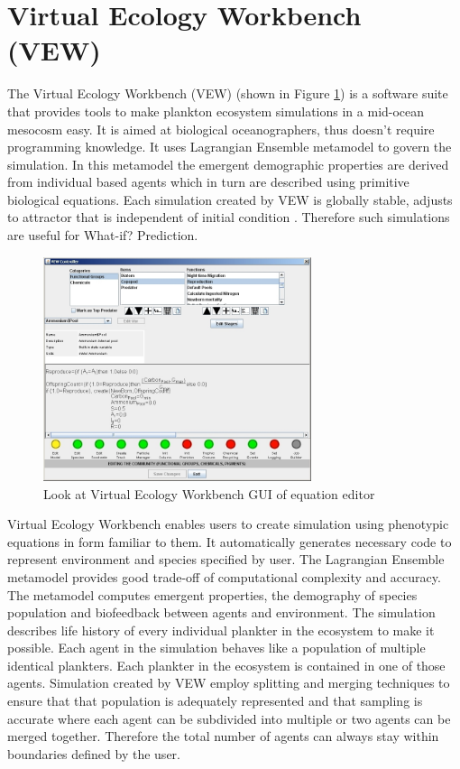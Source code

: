 \documentclass[12pt, a4paper]{report}
\begin{document}
\section{Virtual Ecology Workbench (VEW)}\label{sec:vew}
The Virtual Ecology Workbench (VEW) (shown in Figure \ref{fig:VEW})
is a software suite that provides tools to make plankton ecosystem
simulations in a mid-ocean mesocosm easy. It is aimed at biological
oceanographers, thus doesn't require programming knowledge. It uses
Lagrangian Ensemble metamodel to govern the simulation. In this
metamodel the emergent demographic properties are derived from
individual based agents which in turn are described
using primitive biological equations. Each simulation created
by VEW is globally stable, adjusts to attractor that is independent
of initial condition \cite{Woods2005}. Therefore such simulations
are useful for What-if? Prediction.

\begin{figure}[H]
  \begin{center}
    \includegraphics[width=0.7\textwidth,natwidth=808,natheight=676]{images/vew2007-10.jpg}
    \caption{Look at Virtual Ecology Workbench GUI of equation editor}
    \label{fig:VEW}
  \end{center}
\end{figure}

Virtual Ecology Workbench enables users to create simulation using
phenotypic equations in form familiar to them. It automatically
generates necessary code to represent environment and species
specified by user. The Lagrangian Ensemble metamodel
provides good trade-off of computational complexity and accuracy.
The metamodel computes emergent properties, the demography
of species population and biofeedback between agents and environment.
The simulation describes life history of every individual plankter
in the ecosystem to make it possible. Each agent in the simulation
behaves like a population of multiple identical plankters. Each
plankter in the ecosystem is contained in one of those agents.
Simulation created by VEW employ splitting and merging techniques
to ensure that that population is adequately represented and
that sampling is accurate where each agent can be subdivided into
multiple or two agents can be merged together. Therefore the
total number of agents can always stay within boundaries
defined by the user.
\end{document}
